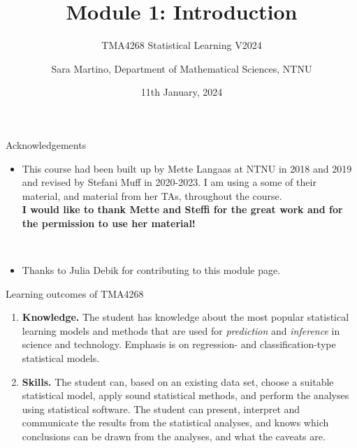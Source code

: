 \documentclass[
  10pt,
  ignorenonframetext,
]{beamer}
\title{Module 1: Introduction}
\subtitle{TMA4268 Statistical Learning V2024}
\author{Sara Martino, Department of Mathematical Sciences, NTNU}
\date{11th January, 2024}
\providecommand{\tightlist}{%
  \setlength{\itemsep}{0pt}\setlength{\parskip}{0pt}}
\begin{document}
\frame{\titlepage}

\begin{frame}{Acknowledgements}
\protect\hypertarget{acknowledgements}{}
\begin{itemize}
\tightlist
\item
  This course had been built up by Mette Langaas at NTNU in 2018 and
  2019 and revised by Stefani Muff in 2020-2023. I am using a some of
  their material, and material from her TAs, throughout the course.\\
  \vspace{2mm} \textbf{I would like to thank Mette and Steffi for the
  great work and for the permission to use her material!}
\end{itemize}

\(~\)

\begin{itemize}
\tightlist
\item
  Thanks to Julia Debik for contributing to this module page.
\end{itemize}
\end{frame}

\begin{frame}{Learning outcomes of TMA4268}
\protect\hypertarget{learning-outcomes-of-tma4268}{}
\begin{enumerate}
\item
  \textbf{Knowledge.} The student has knowledge about the most popular
  statistical learning models and methods that are used for
  \emph{prediction} and \emph{inference} in science and technology.
  Emphasis is on regression- and classification-type statistical models.
\item
  \textbf{Skills.} The student can, based on an existing data set,
  choose a suitable statistical model, apply sound statistical methods,
  and perform the analyses using statistical software. The student can
  present, interpret and communicate the results from the statistical
  analyses, and knows which conclusions can be drawn from the analyses,
  and what the caveats are.
\end{enumerate}
\end{frame}
\end{document}
